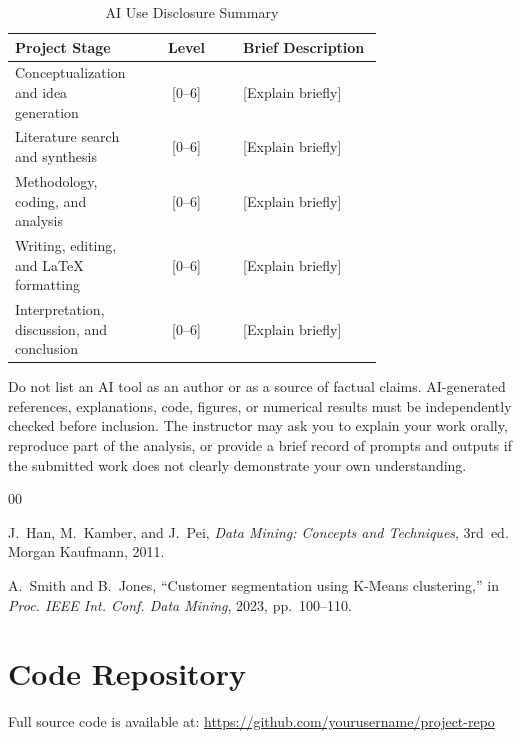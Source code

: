 \documentclass[conference]{IEEEtran}
\begin{document}
	\begin{table}[htbp]
		\caption{AI Use Disclosure Summary}
		\label{tab:ai_use}
		\centering
		\footnotesize
		\begin{tabular}{|p{0.35\linewidth}|c|p{0.38\linewidth}|}
			\hline
			\textbf{Project Stage} & \textbf{Level} & \textbf{Brief Description} \\
			\hline
			Conceptualization and idea generation & [0--6] & [Explain briefly] \\
			\hline
			Literature search and synthesis & [0--6] & [Explain briefly] \\
			\hline
			Methodology, coding, and analysis & [0--6] & [Explain briefly] \\
			\hline
			Writing, editing, and LaTeX formatting & [0--6] & [Explain briefly] \\
			\hline
			Interpretation, discussion, and conclusion & [0--6] & [Explain briefly] \\
			\hline
		\end{tabular}
	\end{table}
	
	Do not list an AI tool as an author or as a source of factual claims. AI-generated references, explanations, code, figures, or numerical results must be independently checked before inclusion. The instructor may ask you to explain your work orally, reproduce part of the analysis, or provide a brief record of prompts and outputs if the submitted work does not clearly demonstrate your own understanding.
	

	\begin{thebibliography}{00}
		
		 J.~Han, M.~Kamber, and J.~Pei, \textit{Data Mining: Concepts and Techniques}, 3rd~ed. Morgan Kaufmann, 2011.
		
		 A.~Smith and B.~Jones, ``Customer segmentation using K-Means clustering,'' in \textit{Proc. IEEE Int. Conf. Data Mining}, 2023, pp.~100--110.
		
	\end{thebibliography}
	
	\newpage	
	\appendix
	
	\section{Code Repository}
	\label{app:code}
	
	Full source code is available at: \url{https://github.com/yourusername/project-repo}
	
\end{document}
